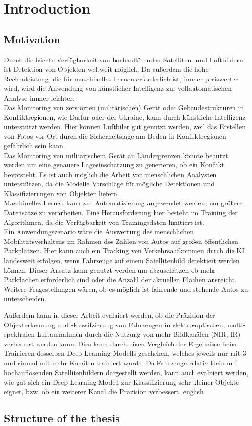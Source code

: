 \chapter{Introduction}
\label{ch:intro}

\section{Motivation}
\ifimportant
    Durch die leichte Verfügbarkeit von hochauflösenden Satelliten- und Luftbildern ist Detektion von Objekten weltweit möglich. Da außerdem die hohe Rechenleistung, die für maschinelles Lernen erforderlich ist, immer preiswerter wird, wird die Anwendung von künstlicher Intelligenz zur vollautomatischen Analyse immer leichter. \\
    Das Monitoring von zerstörten (militärischen) Gerät oder Gebäudestrukturen in Konfliktregionen, wie Darfur \cite{Knoth2017} oder der Ukraine, kann durch künstliche Intelligenz unterstützt werden. Hier können Luftbiler gut genutzt werden, weil das Erstellen von Fotos vor Ort durch die Sicherheitslage am Boden in Konfliktregionen gefährlich sein kann. \\
    Das Monitoring von militärischem Gerät an Ländergrenzen könnte benutzt werden um eine genauere Lageeinschätzung zu generieren, ob ein Konflikt bevorsteht. Es ist auch möglich die Arbeit von menschlichen Analysten unterstützen, da die Modelle Vorschläge für mögliche Detektionen und Klassifizierungen von Objekten liefern. \\
    Maschinelles Lernen kann zur Automatisierung angewendet werden, um größere Datensätze zu verarbeiten. Eine Herausforderung hier besteht im Training der Algorithmen, da die Verfügbarkeit von Trainingsdaten limitiert ist.\\

    Ein Anwendungszenario wäre die Auswertung des menschlichen Mobilitätsverhaltens im Rahmen des Zählen von Autos auf großen öffentlichen Parkplätzen. Hier kann auch ein Tracking von Verkehrsaufkommen durch die KI landesweit erfolgen, wenn Fahrzeuge auf einem Satellitenbild detektiert werden können. Dieser Ansatz kann genutzt werden um abzuschätzen ob mehr Parkflächen erforderlich sind oder die Anzahl der aktuellen Flächen ausreicht. Weitere Fragestellungen wären, ob es möglich ist fahrende und stehende Autos zu unterscheiden. 

    Außerdem kann in dieser Arbeit evaluiert werden, ob die Präzision der  Objekterkennung und -klassifzierung von Fahrzeugen in elektro-optischen, multi-spektralen Luftaufnahmen durch die Nutzung von mehr Bildkanälen (NIR, IR) verbessert werden kann. Dies kann durch einen Vergleich der Ergebnisse beim Trainieren desselben Deep Learning Modells geschehen, welches jeweils nur mit 3 und einmal mit  mehr Kanälen trainiert wurde. Da Fahrzeuge relativ klein auf hochauflösenden Satellitenbildern dargestellt werden, kann auch evaluiert werden, wie gut sich ein Deep Learning Modell zur Klassifizierung sehr kleiner Objekte eignet, bzw. ob ein weiterer Kanal die Präzision verbessert.
\else
english
\fi
\section{Structure of the thesis}